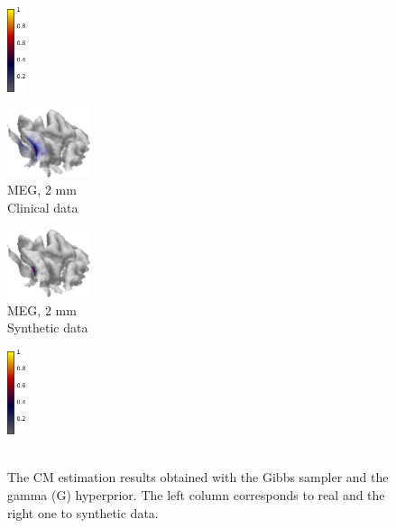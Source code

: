 \documentclass[5p]{elsarticle}
\begin{document}
\begin{figure}[h!]
\begin{footnotesize}
\begin{center}
\begin{minipage}{3cm}
\begin{center}
\end{center}\end{minipage} \begin{minipage}{0.5cm} \begin{center}
\includegraphics[height=2.5cm]{colorbar.png} \\ \null
\end{center}
\end{minipage} \vskip0.2cm
\begin{minipage}{3cm} \begin{center}
\includegraphics[height=2.0cm]{CM_MEG_G_2mm.png}\\ MEG, 2 mm \\ Clinical data 
\end{center}\end{minipage}
\begin{minipage}{3cm} \begin{center}
\includegraphics[height=2.0cm]{CM_MEG_G_2mm_syntheticdata.png} \\ MEG, 2 mm \\ Synthetic data
\end{center}\end{minipage}
\begin{minipage}{0.5cm} \begin{center}
\includegraphics[height=2.5cm]{colorbar.png} \\ \mbox{} \\ \mbox{}
\end{center}
\end{minipage}
\end{center}
\end{footnotesize}
\caption{The CM estimation results obtained with the Gibbs sampler and the gamma (G) hyperprior. The left column corresponds to real and the right one to synthetic data.}
\label{fig:somatosensory_results_2} 
\end{figure}
\end{document}

